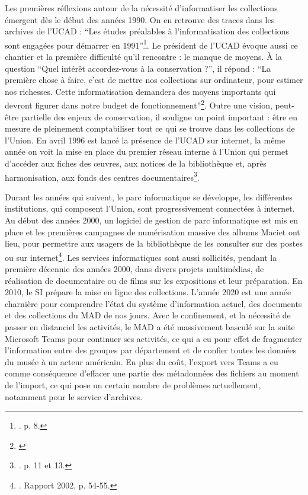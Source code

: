 Les premières réflexions autour de la nécessité d'informatiser les collections émergent dès le début des années 1990. On en retrouve des traces dans les archives de l'UCAD : \enquote{Les études préalables à l'informatisation des collections sont engagées pour démarrer en 1991}\footnote{\cite{noauthor__1991}. p. 8.}. Le président de l'UCAD évoque aussi ce chantier et la première difficulté qu'il rencontre : le manque de moyens. À la question \enquote{Quel intérêt accordez-vous à la conservation ?}, il répond : \enquote{La première chose à faire, c'est de mettre nos collections sur ordinateur, pour estimer nos richesses. Cette informatisation demandera des moyens importants qui devront figurer dans notre budget de fonctionnement}\footnote{\cite{noauthor_entretien_1991}}. Outre une vision, peut-être partielle des enjeux de conservation, il souligne un point important : être en mesure de pleinement comptabiliser tout ce qui se trouve dans les collections de l'Union. En avril 1996 est lancé la présence de l'UCAD sur internet, la même année on voit la mise en place du premier réseau interne à l'Union qui permet d'accéder aux fiches des œuvres, aux notices de la bibliothèque et, après harmonisation, aux fonds des centres documentaires\footnote{\cite{noauthor__1996}. p. 11 et 13.}. 

Durant les années qui suivent, le parc informatique se développe, les différentes institutions, qui composent l'Union, sont progressivement connectées à internet. Au début des années 2000, un logiciel de gestion de parc informatique est mis en place et les premières campagnes de numérisation massive des albums Maciet ont lieu, pour permettre aux usagers de la bibliothèque de les consulter sur des postes ou sur internet\footnote{\cite{noauthor__1982}. Rapport 2002, p. 54-55.}. Les services informatiques sont aussi sollicités, pendant la première décennie des années 2000, dans divers projets multimédias, de réalisation de documentaire ou de films sur les expositions et leur préparation. En 2010, le SI prépare la mise en ligne des collections. L'année 2020 est une année charnière pour comprendre l'état du système d'information actuel, des documents et des collections du MAD de nos jours. Avec le confinement, et la nécessité de passer en distanciel les activités, le MAD a été massivement basculé sur la suite Microsoft Teams pour continuer ses activités, ce qui a eu pour effet de fragmenter l'information entre des groupes par département et de confier toutes les données du musée à un acteur américain. En plus du coût, l'export vers Teams a eu comme conséquence d'effacer une partie des métadonnées des fichiers au moment de l'import, ce qui pose un certain nombre de problèmes actuellement, notamment pour le service d'archives. 

